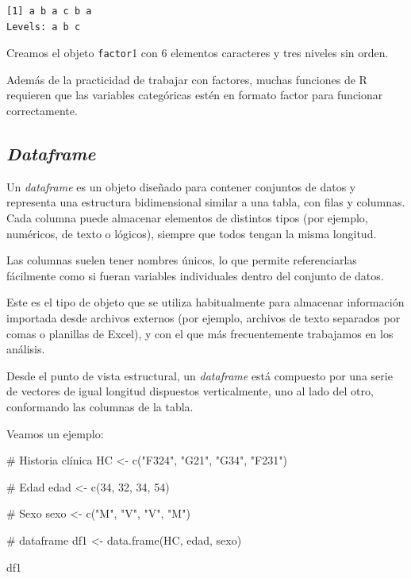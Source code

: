 \documentclass[
  spanish,
  letterpaper,
  DIV=11,
  numbers=noendperiod]{scrreprt}
\newenvironment{Shaded}{\begin{snugshade}}{\end{snugshade}}
\newcommand{\CommentTok}[1]{\textcolor[rgb]{0.37,0.37,0.37}{#1}}
\newcommand{\DecValTok}[1]{\textcolor[rgb]{0.68,0.00,0.00}{#1}}
\newcommand{\FunctionTok}[1]{\textcolor[rgb]{0.28,0.35,0.67}{#1}}
\newcommand{\NormalTok}[1]{\textcolor[rgb]{0.00,0.23,0.31}{#1}}
\newcommand{\OtherTok}[1]{\textcolor[rgb]{0.00,0.23,0.31}{#1}}
\newcommand{\StringTok}[1]{\textcolor[rgb]{0.13,0.47,0.30}{#1}}
\begin{document}
\begin{verbatim}
[1] a b a c b a
Levels: a b c
\end{verbatim}

Creamos el objeto \texttt{factor}1 con 6 elementos caracteres y tres
niveles sin orden.

Además de la practicidad de trabajar con factores, muchas funciones de R
requieren que las variables categóricas estén en formato factor para
funcionar correctamente.

\subsection{\texorpdfstring{\emph{Dataframe}}{Dataframe}}\label{dataframe}

Un \emph{dataframe} es un objeto diseñado para contener conjuntos de
datos y representa una estructura bidimensional similar a una tabla, con
filas y columnas. Cada columna puede almacenar elementos de distintos
tipos (por ejemplo, numéricos, de texto o lógicos), siempre que todos
tengan la misma longitud.

Las columnas suelen tener nombres únicos, lo que permite referenciarlas
fácilmente como si fueran variables individuales dentro del conjunto de
datos.

Este es el tipo de objeto que se utiliza habitualmente para almacenar
información importada desde archivos externos (por ejemplo, archivos de
texto separados por comas o planillas de Excel), y con el que más
frecuentemente trabajamos en los análisis.

Desde el punto de vista estructural, un \emph{dataframe} está compuesto
por una serie de vectores de igual longitud dispuestos verticalmente,
uno al lado del otro, conformando las columnas de la tabla.

Veamos un ejemplo:

\begin{Shaded}
\begin{Highlighting}[]
\CommentTok{\# Historia clínica}
\NormalTok{HC }\OtherTok{\textless{}{-}} \FunctionTok{c}\NormalTok{(}\StringTok{"F324"}\NormalTok{, }\StringTok{"G21"}\NormalTok{, }\StringTok{"G34"}\NormalTok{, }\StringTok{"F231"}\NormalTok{)}

\CommentTok{\# Edad}
\NormalTok{edad }\OtherTok{\textless{}{-}} \FunctionTok{c}\NormalTok{(}\DecValTok{34}\NormalTok{, }\DecValTok{32}\NormalTok{, }\DecValTok{34}\NormalTok{, }\DecValTok{54}\NormalTok{)}

\CommentTok{\# Sexo}
\NormalTok{sexo }\OtherTok{\textless{}{-}} \FunctionTok{c}\NormalTok{(}\StringTok{"M"}\NormalTok{, }\StringTok{"V"}\NormalTok{, }\StringTok{"V"}\NormalTok{, }\StringTok{"M"}\NormalTok{)}

\CommentTok{\# dataframe}
\NormalTok{df1 }\OtherTok{\textless{}{-}} \FunctionTok{data.frame}\NormalTok{(HC, edad, sexo)}

\NormalTok{df1}
\end{Highlighting}
\end{Shaded}
\end{document}
